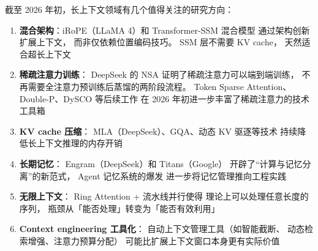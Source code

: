 \begin{corebox}[长上下文的未来方向]
截至 2026 年初，长上下文领域有几个值得关注的研究方向：
\begin{enumerate}[noitemsep]
  \item \textbf{混合架构}：iRoPE（LLaMA 4）和 Transformer-SSM 混合模型
        通过架构创新扩展上下文，
        而非仅依赖位置编码技巧。
        SSM 层不需要 KV cache，
        天然适合超长上下文
  \item \textbf{稀疏注意力训练}：
        DeepSeek 的 NSA 证明了稀疏注意力可以端到端训练，
        不再需要全注意力预训练后蒸馏的两阶段流程。
        Token Sparse Attention、Double-P、DySCO 等后续工作
        在 2026 年初进一步丰富了稀疏注意力的技术工具箱
  \item \textbf{KV cache 压缩}：
        MLA（DeepSeek）、GQA、动态 KV 驱逐等技术
        持续降低长上下文推理的内存开销
  \item \textbf{长期记忆}：
        Engram（DeepSeek）和 Titans（Google）
        开辟了``计算与记忆分离''的新范式，
        Agent 记忆系统的爆发
        进一步将记忆管理推向工程实践
  \item \textbf{无限上下文}：
        Ring Attention + 流水线并行使得
        理论上可以处理任意长度的序列，
        瓶颈从「能否处理」转变为「能否有效利用」
  \item \textbf{Context engineering 工具化}：
        自动上下文管理工具（如智能截断、
        动态检索增强、注意力预算分配）
        可能比扩展上下文窗口本身更有实际价值
\end{enumerate}
\end{corebox}


